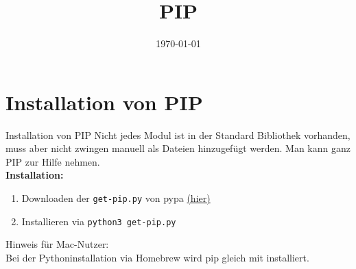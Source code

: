 


\newcommand{\topic}{
	PIP
}

\title{\topic}
\supertitle{\course}
\date{\today}



\maketitle

\begin{frame}
	\tableofcontents
\end{frame}




\section{Installation von PIP}
\begin{frame}{Installation von PIP}
	Nicht jedes Modul ist in der Standard Bibliothek vorhanden, muss aber nicht zwingen manuell als Dateien hinzugefügt werden. Man kann ganz PIP zur Hilfe nehmen.\\[.5cm]
	\textbf{Installation:}\\
	\begin{enumerate}
		\item Downloaden der \texttt{get-pip.py} von pypa \href{https://bootstrap.pypa.io/get-pip.py}{(hier)}
		\item Installieren via \texttt{python3 get-pip.py}\\[.5cm]
	\end{enumerate}
	
	Hinweis für Mac-Nutzer:\\
	Bei der Pythoninstallation via Homebrew wird pip gleich mit installiert.
\end{frame}

